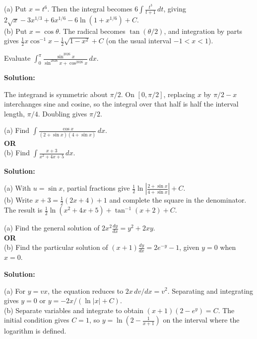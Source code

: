 \documentclass[journal]{IEEEtran}
\begin{document}
\begin{list}{}
(a) Put $x=t^6$. Then the integral becomes $6\int\frac{t^3}{t+1}\,dt$, giving $\boxed{2\sqrt{x}-3x^{1/3}+6x^{1/6}-6\ln(1+x^{1/6})+C}$.\\
(b) Put $x=\cos\theta$. The radical becomes $\tan(\theta/2)$, and integration by parts gives $\boxed{\frac12x\cos^{-1}x-\frac12\sqrt{1-x^2}+C}$ (on the usual interval $-1<x<1$).

\item[3.1.27] Evaluate $\displaystyle\int_0^\pi\frac{\sin^{2026}x}{\sin^{2026}x+\cos^{2026}x}\,dx$.

\vspace{0.6em}\par\noindent\textbf{Solution:}

The integrand is symmetric about $\pi/2$. On $[0,\pi/2]$, replacing $x$ by $\pi/2-x$ interchanges sine and cosine, so the integral over that half is half the interval length, $\pi/4$. Doubling gives $\boxed{\pi/2}$.

\item[3.1.28]
(a) Find $\displaystyle\int\frac{\cos x}{(2+\sin x)(4+\sin x)}\,dx$.\\
\textbf{OR}\\
(b) Find $\displaystyle\int\frac{x+3}{x^2+4x+5}\,dx$.

\vspace{0.6em}\par\noindent\textbf{Solution:}

(a) With $u=\sin x$, partial fractions give $\boxed{\frac12\ln\left|\frac{2+\sin x}{4+\sin x}\right|+C}$.\\
(b) Write $x+3=\frac12(2x+4)+1$ and complete the square in the denominator. The result is $\boxed{\frac12\ln(x^2+4x+5)+\tan^{-1}(x+2)+C}$.

\item[3.1.29]
(a) Find the general solution of $2x^2\frac{dy}{dx}=y^2+2xy$.\\
\textbf{OR}\\
(b) Find the particular solution of $(x+1)\frac{dy}{dx}=2e^{-y}-1$, given $y=0$ when $x=0$.

\vspace{0.6em}\par\noindent\textbf{Solution:}

(a) For $y=vx$, the equation reduces to $2x\,dv/dx=v^2$. Separating and integrating gives $\boxed{y=0}$ or $\boxed{y=-2x/(\ln|x|+C)}$.\\
(b) Separate variables and integrate to obtain $(x+1)(2-e^y)=C$. The initial condition gives $C=1$, so $\boxed{y=\ln\!\left(2-\frac1{x+1}\right)}$ on the interval where the logarithm is defined.


\end{list}
\end{document}
